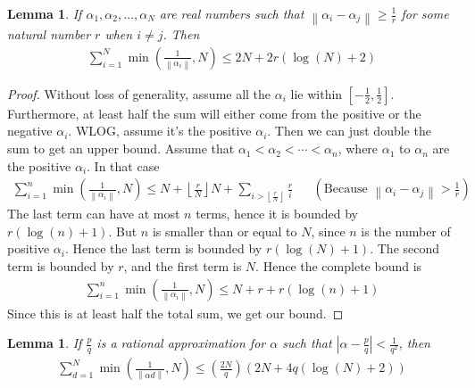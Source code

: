 \documentclass[12pt, titlepage]{article}
\newtheorem{lem}[thm]{Lemma}
\theoremstyle{definition}
\newcommand{\norm}[1]{\left\lVert#1\right\rVert}
\begin{document}
\begin{lem} \label{lem:2}
    If $\alpha_1, \alpha_2, \ldots, \alpha_N$ are real numbers such that $\norm{\alpha_i - \alpha_j} \geq \frac{1}{r}$ for some natural number $r$ when $i \neq j$. Then
    \begin{align*}
        \sum_{i=1}^{N} \min\left( \frac{1}{\norm{\alpha_i}}, N \right) \leq 2N + 2r(\log(N) + 2)
    \end{align*} 
\end{lem}

\begin{proof}
    Without loss of generality, assume all the $\alpha_i$ lie within $\left[ -\frac{1}{2}, \frac{1}{2} \right]$. Furthermore, at least half the sum will either come from the positive or the negative $\alpha_i$. WLOG, assume it's the positive $\alpha_i$. Then we can just double the sum to get an upper bound. Assume that $\alpha_1 < \alpha_2 < \cdots < \alpha_n$, where $\alpha_1$ to $\alpha_n$ are the positive $\alpha_i$. In that case
    \begin{align*}
        \sum_{i=1}^{n}\min\left( \frac{1}{\norm{\alpha_i}}, N  \right) \leq N+ \left\lfloor \frac{r}{N} \right\rfloor N + \sum_{i > \left\lfloor \frac{r}{N} \right\rfloor} \frac{r}{i} &&\left(\text{Because $\norm{\alpha_i -\alpha_j} > \frac{1}{r}$}\right)
    \end{align*}
    The last term can have at most $n$ terms, hence it is bounded by $r (\log(n) + 1)$. But $n$ is smaller than or equal to $N$, since $n$ is the number of positive $\alpha_i$. Hence the last term is bounded by $r(\log(N) + 1)$. The second term is bounded by $r$, and the first term is $N$. Hence the complete bound is
    \begin{align*}
        \sum_{i=1}^{n}\min\left( \frac{1}{\norm{\alpha_i}}, N  \right) \leq N + r + r(\log(n) + 1)
    \end{align*}
    Since this is at least half the total sum, we get our bound.
\end{proof}

\begin{lem}
    If $\frac{p}{q}$ is a rational approximation for $\alpha$ such that $\left| \alpha - \frac{p}{q} \right| < \frac{1}{q^2}$, then
    \begin{align*}
        \sum_{d=1}^{N} \min\left( \frac{1}{\norm{\alpha d}}, N \right) \leq \left( \frac{2N}{q}\right) \left( 2N +4q(\log(N) +2) \right)
    \end{align*}
\end{lem}
\end{document}
